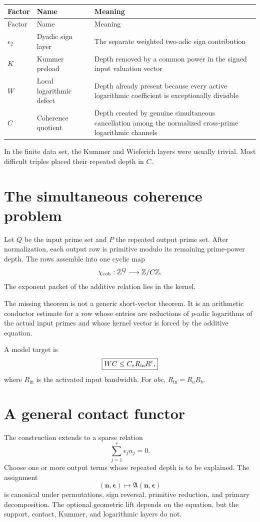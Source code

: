\begin{longtable}{L{0.14\textwidth}L{0.28\textwidth}L{0.48\textwidth}}
\toprule
Factor & Name & Meaning\\
\midrule
\endfirsthead
\toprule
Factor & Name & Meaning\\
\midrule
\endhead
$\epsilon_2$ & Dyadic sign layer & The separate weighted two-adic sign contribution\\
$K$ & Kummer preload & Depth removed by a common power in the signed input valuation vector\\
$W$ & Local logarithmic defect & Depth already present because every active logarithmic coefficient is exceptionally divisible\\
$C$ & Coherence quotient & Depth created by genuine simultaneous cancellation among the normalized cross-prime logarithmic channels\\
\bottomrule
\end{longtable}

In the finite data set, the Kummer and Wieferich layers were usually trivial. Most difficult triples placed their repeated depth in $C$.

\section{The simultaneous coherence problem}
Let $Q$ be the input prime set and $P$ the repeated output prime set. After normalization, each output row is primitive modulo its remaining prime-power depth. The rows assemble into one cyclic map
\[
\chi_{\mathrm{coh}}:\mathbb Z^Q\longrightarrow\mathbb Z/C\mathbb Z.
\]
The exponent packet of the additive relation lies in the kernel.

The missing theorem is not a generic short-vector theorem. It is an arithmetic conductor estimate for a row whose entries are reductions of $p$-adic logarithms of the actual input primes and whose kernel vector is forced by the additive equation.

A model target is
\[
\boxed{
WC
\le
C_\varepsilon
R_{\mathrm{in}}R^\varepsilon,
}
\]
where $R_{\mathrm{in}}$ is the activated input bandwidth. For $abc$, $R_{\mathrm{in}}=R_aR_b$.

\section{A general contact functor}
The construction extends to a sparse relation
\[
\sum_{j=1}^{r}\epsilon_jn_j=0.
\]
Choose one or more output terms whose repeated depth is to be explained. The assignment
\[
(\mathbf n,\boldsymbol\epsilon)
\longmapsto
\mathfrak A(\mathbf n,\boldsymbol\epsilon)
\]
is canonical under permutations, sign reversal, primitive reduction, and primary decomposition. The optional geometric lift depends on the equation, but the support, contact, Kummer, and logarithmic layers do not.

